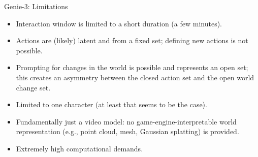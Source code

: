 \begin{frame}[t]{Genie-3: Limitations}
  \begin{itemize}\itemsep0.37em
    \item Interaction window is limited to a short duration (a few minutes).
    \item Actions are (likely) latent and from a fixed set; defining new actions is not possible.
    \item Prompting for changes in the world is possible and represents an open set; this creates an asymmetry between the closed action set and the open world change set.
    \item Limited to one character (at least that seems to be the case).
    \item Fundamentally just a video model: no game-engine-interpretable world representation (e.g., point cloud, mesh, Gaussian splatting) is provided.
    \item Extremely high computational demands.
  \end{itemize}
\end{frame}
